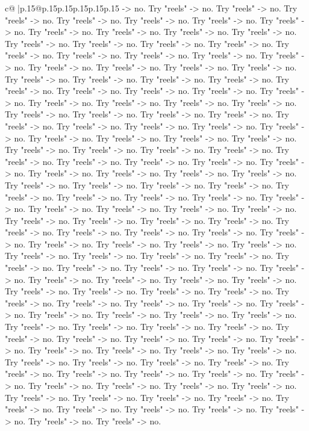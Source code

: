 \documentclass{article}
\begin{document}
{\begin{supertabular}{c@{$\;$}|p{.15\linewidth}@{}p{.15\linewidth}p{.15\linewidth}p{.15\linewidth}p{.15\linewidth}p{.15\linewidth}}
{{{{-}> no. Try "reels" {-}> no. Try "reels" {-}> no. Try "reels" {-}> no. Try "reels" {-}> no. Try "reels" {-}> no. Try "reels" {-}> no. Try "reels" {-}> no. Try "reels" {-}> no. Try "reels" {-}> no. Try "reels" {-}> no. Try "reels" {-}> no. Try "reels" {-}> no. Try "reels" {-}> no. Try "reels" {-}> no. Try "reels" {-}> no. Try "reels" {-}> no. Try "reels" {-}> no. Try "reels" {-}> no. Try "reels" {-}> no. Try "reels" {-}> no. Try "reels" {-}> no. Try "reels" {-}> no. Try "reels" {-}> no. Try "reels" {-}> no. Try "reels" {-}> no. Try "reels" {-}> no. Try "reels" {-}> no. Try "reels" {-}> no. Try "reels" {-}> no. Try "reels" {-}> no. Try "reels" {-}> no. Try "reels" {-}> no. Try "reels" {-}> no. Try "reels" {-}> no. Try "reels" {-}> no. Try "reels" {-}> no. Try "reels" {-}> no. Try "reels" {-}> no. Try "reels" {-}> no. Try "reels" {-}> no. Try "reels" {-}> no. Try "reels" {-}> no. Try "reels" {-}> no. Try "reels" {-}> no. Try "reels" {-}> no. Try "reels" {-}> no. Try "reels" {-}> no. Try "reels" {-}> no. Try "reels" {-}> no. Try "reels" {-}> no. Try "reels" {-}> no. Try "reels" {-}> no. Try "reels" {-}> no. Try "reels" {-}> no. Try "reels" {-}> no. Try "reels" {-}> no. Try "reels" {-}> no. Try "reels" {-}> no. Try "reels" {-}> no. Try "reels" {-}> no. Try "reels" {-}> no. Try "reels" {-}> no. Try "reels" {-}> no. Try "reels" {-}> no. Try "reels" {-}> no. Try "reels" {-}> no. Try "reels" {-}> no. Try "reels" {-}> no. Try "reels" {-}> no. Try "reels" {-}> no. Try "reels" {-}> no. Try "reels" {-}> no. Try "reels" {-}> no. Try "reels" {-}> no. Try "reels" {-}> no. Try "reels" {-}> no. Try "reels" {-}> no. Try "reels" {-}> no. Try "reels" {-}> no. Try "reels" {-}> no. Try "reels" {-}> no. Try "reels" {-}> no. Try "reels" {-}> no. Try "reels" {-}> no. Try "reels" {-}> no. Try "reels" {-}> no. Try "reels" {-}> no. Try "reels" {-}> no. Try "reels" {-}> no. Try "reels" {-}> no. Try "reels" {-}> no. Try "reels" {-}> no. Try "reels" {-}> no. Try "reels" {-}> no. Try "reels" {-}> no. Try "reels" {-}> no. Try "reels" {-}> no. Try "reels" {-}> no. Try "reels" {-}> no. Try "reels" {-}> no. Try "reels" {-}> no. Try "reels" {-}> no. Try "reels" {-}> no. Try "reels" {-}> no. Try "reels" {-}> no. Try "reels" {-}> no. Try "reels" {-}> no. Try "reels" {-}> no. Try "reels" {-}> no. Try "reels" {-}> no. Try "reels" {-}> no. Try "reels" {-}> no. Try "reels" {-}> no. Try "reels" {-}> no. Try "reels" {-}> no. Try "reels" {-}> no. Try "reels" {-}> no. Try "reels" {-}> no. Try "reels" {-}> no. Try "reels" {-}> no. Try "reels" {-}> no. Try "reels" {-}> no. Try "reels" {-}> no. Try "reels" {-}> no. Try "reels" {-}> no. Try "reels" {-}> no. Try "reels" {-}> no. Try "reels" {-}> no. Try "reels" {-}> no. Try "reels" {-}> no. Try "reels" {-}> no. Try "reels" {-}> no. Try "reels" {-}> no. Try "reels" {-}> no. Try "reels" {-}> no. Try "reels" {-}> no. Try "reels" {-}> no. Try "reels" {-}> no. Try "reels" {-}> no. Try "reels" {-}> no. Try "reels" {-}> no. Try "reels" {-}> no. Try "reels" {-}> no. Try "reels" {-}> no. Try "reels" {-}> no. Try "reels" {-}> no. Try "reels" {-}> no. Try "reels" {-}> no. Try "reels" {-}> no. Try "reels" {-}> no. Try "reels" {-}> no. Try "reels" {-}> no. }}}
\end{supertabular}}
\end{document}
